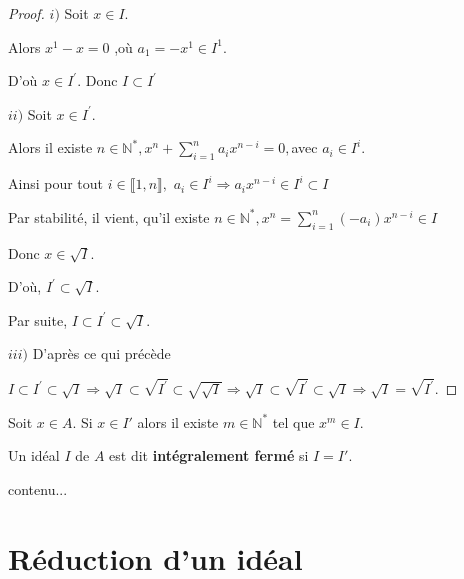 \begin{proof}
	$i)$ Soit $x\in I.$
	
	Alors $x^{1}-x=0$ ,où $a_{1}=-x^{1}\in I^{1}.$
	
	D'où $x\in I^{\prime }.$ Donc $I\subset I^{\prime }$
	
	$ii)$ Soit $x\in I^{\prime }.$
	
	Alors il existe $n\in \mathbb{N}^{\ast },x^{n}+\sum\limits_{i=1}^{n}a_{i}x^{n-i}=0,$avec $a_{i}\in I^{i}.$
	
	Ainsi pour tout $i\in \llbracket 1, n \rrbracket,$ $a_{i}\in I^{i}\Rightarrow
	a_{i}x^{n-i}\in I^{i}\subset I$
	
	Par stabilité, il vient, qu'il existe $n\in \mathbb{N}^{\ast },x^{n}=\sum\limits_{i=1}^{n}(-a_{i})x^{n-i}\in I$
	
	Donc $x\in \sqrt{I}.$
	
	D'où, $I^{\prime }\subset \sqrt{I}.$
	
	Par suite, $I\subset I^{\prime }\subset \sqrt{I}.$
	
	$iii)$ D'après ce qui précède
	
	$I\subset I^{\prime }\subset \sqrt{I}\Rightarrow \sqrt{I}\subset \sqrt{I^{\prime }}\subset \sqrt{\sqrt{I}}\Rightarrow \sqrt{I}\subset \sqrt{I^{\prime }}\subset \sqrt{I}\Rightarrow \sqrt{I}=\sqrt{I^{\prime }}.$
\end{proof}
\begin{maconsequence}
	Soit $x \in A$.
	Si $x \in I'$ alors il existe $m \in \mathbb{N^*}$ tel que $x^m \in I$.
\end{maconsequence}
\begin{madefinition}
	Un idéal $I$ de $A$ est dit \textbf{intégralement fermé} si $I = I'$.
\end{madefinition}
\begin{monexemple}
	contenu...
\end{monexemple}
\section{Réduction d'un idéal}
